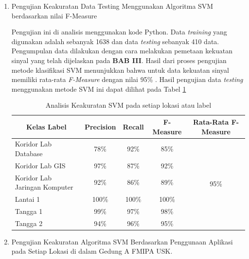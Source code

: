 \begin{enumerate}

	\item Pengujian Keakuratan Data Testing Menggunakan Algoritma SVM berdasarkan nilai F-Measure

	      \par Pengujian ini di analisis menggunakan kode Python. Data \textit{training} yang digunakan adalah sebanyak 1638 dan data \textit{testing} sebanyak 410 data. Pengumpulan data dilakukan dengan cara melakukan pemetaan kekuatan sinyal yang telah dijelaskan pada \textbf{BAB III}. Hasil dari proses pengujian metode klasifikasi SVM menunjukkan bahwa untuk data kekuatan sinyal memiliki rata-rata \textit{F-Measure} dengan nilai 95\% . Hasil pengujian data \textit{testing} menggunakan metode SVM ini dapat dilihat pada Tabel \ref{tabelpercobaansvm1}

	      \begin{table}[H]
		      \center
		      \caption{Analisis Keakuratan SVM pada setiap lokasi atau label}
		      \label{tabelpercobaansvm1}
		      \begin{tabular}{|l|c|c|c|c|}
			      \hline
			      \multicolumn{1}{|c|}{Kelas Label} & Precision & Recall & F-Measure & Rata-Rata F-Measure   \\ \hline
			      Koridor Lab Database              & 78\%      & 92\%   & 85\%      & \multirow{6}{*}{95\%} \\ \cline{1-4}
			      Koridor Lab GIS                   & 97\%      & 87\%   & 92\%      &                       \\ \cline{1-4}
			      Koridor Lab Jaringan Komputer     & 92\%      & 86\%   & 89\%      &                       \\ \cline{1-4}
			      Lantai 1                          & 100\%     & 100\%  & 100\%     &                       \\ \cline{1-4}
			      Tangga 1                          & 99\%      & 97\%   & 98\%      &                       \\ \cline{1-4}
			      Tangga 2                          & 94\%      & 96\%   & 95\%      &                       \\ \hline
		      \end{tabular}
	      \end{table}

	\item Pengujian Keakuratan Algoritma SVM Berdasarkan Penggunaan Aplikasi pada Setiap Lokasi di dalam Gedung A FMIPA USK.


\end{enumerate}
